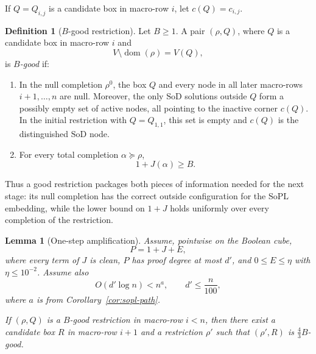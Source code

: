 \documentclass[11pt]{article}
\newtheorem{lemma}[theorem]{Lemma}
\theoremstyle{definition}
\newtheorem{definition}[theorem]{Definition}
\newcommand{\SoPL}{\mathrm{SoPL}}
\newcommand{\SoD}{\mathrm{SoD}}
\begin{document}
If $Q=Q_{i,j}$ is a candidate box in macro-row $i$, let $c(Q)=c_{i,j}$.

\begin{definition}[$B$-good restriction]\label{def:good-state}
Let $B\ge1$.  A pair $(\rho,Q)$, where $Q$ is a candidate box in macro-row $i$ and
\[
  V\setminus\operatorname{dom}(\rho)=V(Q),
\]
is \emph{$B$-good} if:
\begin{enumerate}[label=(G\arabic*)]
\item In the null completion $\rho^{0}$, the box $Q$ and every node in all later
macro-rows $i+1,\ldots,n$ are null.  Moreover, the only $\SoD$ solutions outside $Q$
form a possibly empty set of active nodes, all pointing to the inactive corner
$c(Q)$.  In the initial restriction with $Q=Q_{1,1}$, this set is empty and $c(Q)$ is
the distinguished $\SoD$ node.
\item For every total completion $\alpha\succeq\rho$,
\[
  1+J(\alpha)\ge B.
  \tag{6.2}\label{eq:good-numerical}
\]
\end{enumerate}
\end{definition}

Thus a good restriction packages both pieces of information needed for the next
stage: its null completion has the correct outside configuration for the $\SoPL$
embedding, while the lower bound on $1+J$ holds uniformly over every completion of
the restriction.

\begin{lemma}[One-step amplification]\label{lem:one-step-amplification}
Assume, pointwise on the Boolean cube,
\[
  P=1+J+E,
\]
where every term of $J$ is clean, $P$ has proof degree at most $d'$, and
$0\le E\le\eta$ with $\eta\le10^{-2}$.  Assume also
\[
  O(d'\log n)<n^a,
  \qquad
  d'\le\frac n{100},
  \tag{6.3}\label{eq:one-step-degree}
\]
where $a$ is from Corollary~\ref{cor:sopl-path}.

If $(\rho,Q)$ is a $B$-good restriction in macro-row $i<n$, then there exist a
candidate box $R$ in macro-row $i+1$ and a restriction $\rho'$ such that
$(\rho',R)$ is $\frac43B$-good.
\end{lemma}
\end{document}
